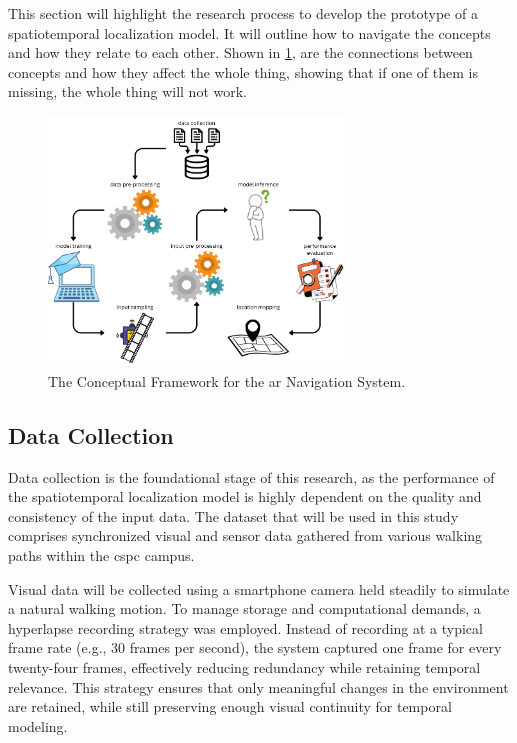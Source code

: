 \begin{refsection}
This section will highlight the research process to develop the prototype of a spatiotemporal localization model. It will outline how to navigate the concepts and how they relate to each other. Shown in \ref{fig:thirdFig}, are the connections between concepts and how they affect the whole thing, showing that if one of them is missing, the whole thing will not work.

\begin{figure}[H]
    \centering
	\includegraphics[width=0.7\textwidth]{figures/framework.png} 
	\caption[Conceptual Framework for the \gls{ar} Navigation System]{The Conceptual Framework for the \gls{ar} Navigation System.}
	\label{fig:thirdFig}
\end{figure}

\subsection{Data Collection}

Data collection is the foundational stage of this research, as the performance of the spatiotemporal localization model is highly dependent on the quality and consistency of the input data. The dataset that will be used in this study comprises synchronized visual and sensor data gathered from various walking paths within the \gls{cspc} campus.

Visual data will be collected using a smartphone camera held steadily to simulate a natural walking motion. To manage storage and computational demands, a hyperlapse recording strategy was employed. Instead of recording at a typical frame rate (e.g., 30 frames per second), the system captured one frame for every twenty-four frames, effectively reducing redundancy while retaining temporal relevance. This strategy ensures that only meaningful changes in the environment are retained, while still preserving enough visual continuity for temporal modeling.


\end{refsection}
